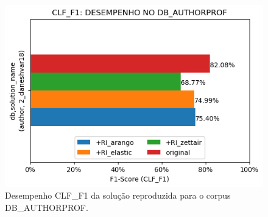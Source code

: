 \begin{figure}[h]
    \centering
    \caption{Desempenho CLF\_F1 da solução reproduzida para o corpus DB\_AUTHORPROF.}
    \vspace{-0.0cm}
    \begin{center}
        \includegraphics[width=1.0\textwidth]{img/clf-f1-bars-authorprof.png}
    \end{center}
    \vspace{-0.0cm}
    \label{fig:clf-f1-bars-authorprof}
\end{figure}